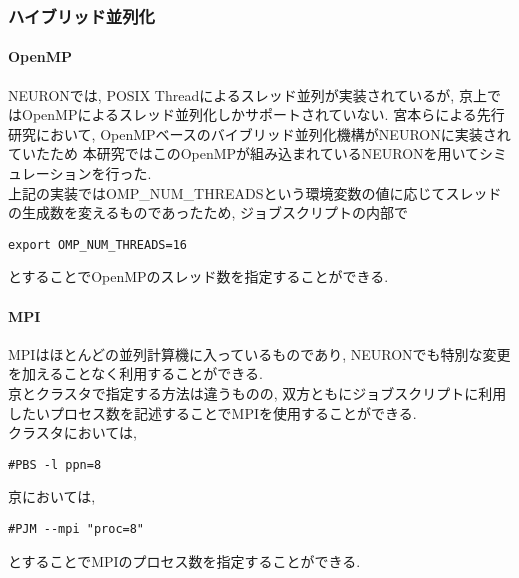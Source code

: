 \subsubsection{ハイブリッド並列化}
\paragraph{OpenMP}
NEURONでは, POSIX Threadによるスレッド並列が実装されているが, 京上ではOpenMPによるスレッド並列化しかサポートされていない.
宮本らによる先行研究\cite{miyamoto-master}において, OpenMPベースのバイブリッド並列化機構がNEURONに実装されていたため
本研究ではこのOpenMPが組み込まれているNEURONを用いてシミュレーションを行った.\\
上記の実装ではOMP\_NUM\_THREADSという環境変数の値に応じてスレッドの生成数を変えるものであったため, ジョブスクリプトの内部で
{\footnotesize
\begin{lstlisting}[caption=OpenMPスレッド数の指定,label=cluster-job-example,numbers=none]
export OMP_NUM_THREADS=16
\end{lstlisting}
}
とすることでOpenMPのスレッド数を指定することができる.\\

\paragraph{MPI}
MPIはほとんどの並列計算機に入っているものであり, NEURONでも特別な変更を加えることなく利用することができる.\\
京とクラスタで指定する方法は違うものの, 双方ともにジョブスクリプトに利用したいプロセス数を記述することでMPIを使用することができる.\\
クラスタにおいては,
{\footnotesize
\begin{lstlisting}[caption=クラスタ MPIプロセス数の指定,label=cluster-mpi-num-process,numbers=none]
#PBS -l ppn=8
\end{lstlisting}
}
京においては,
{\footnotesize
\begin{lstlisting}[caption=京 MPIプロセス数の指定,label=k-mpi-num-process,numbers=none]
#PJM --mpi "proc=8"
\end{lstlisting}
}
とすることでMPIのプロセス数を指定することができる.\\

